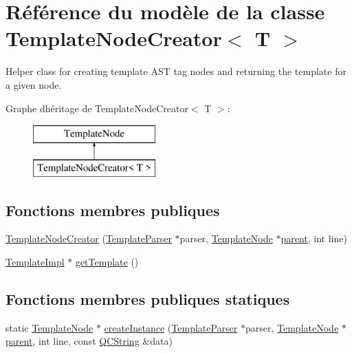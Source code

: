 \hypertarget{class_template_node_creator}{}\section{Référence du modèle de la classe Template\+Node\+Creator$<$ T $>$}
\label{class_template_node_creator}


Helper class for creating template A\+S\+T tag nodes and returning the template for a given node.  


Graphe d\textquotesingle{}héritage de Template\+Node\+Creator$<$ T $>$\+:\begin{figure}[H]
\begin{center}
\leavevmode
\includegraphics[height=2.000000cm]{class_template_node_creator}
\end{center}
\end{figure}
\subsection*{Fonctions membres publiques}
\begin{DoxyCompactItemize}
\item 
\hyperlink{class_template_node_creator_a7b699e3738800d14e5c7f506fa2684df}{Template\+Node\+Creator} (\hyperlink{class_template_parser}{Template\+Parser} $\ast$parser, \hyperlink{class_template_node}{Template\+Node} $\ast$\hyperlink{class_template_node_a69a306ef84e62af9fe57bf9aacc94536}{parent}, int line)
\item 
\hyperlink{class_template_impl}{Template\+Impl} $\ast$ \hyperlink{class_template_node_creator_a4052c0be982c3a090192053ae608ec2e}{get\+Template} ()
\end{DoxyCompactItemize}
\subsection*{Fonctions membres publiques statiques}
\begin{DoxyCompactItemize}
\item 
static \hyperlink{class_template_node}{Template\+Node} $\ast$ \hyperlink{class_template_node_creator_a8914a8c5da5c6bbba87942cf7135dea5}{create\+Instance} (\hyperlink{class_template_parser}{Template\+Parser} $\ast$parser, \hyperlink{class_template_node}{Template\+Node} $\ast$\hyperlink{class_template_node_a69a306ef84e62af9fe57bf9aacc94536}{parent}, int line, const \hyperlink{class_q_c_string}{Q\+C\+String} \&data)
\end{DoxyCompactItemize}
